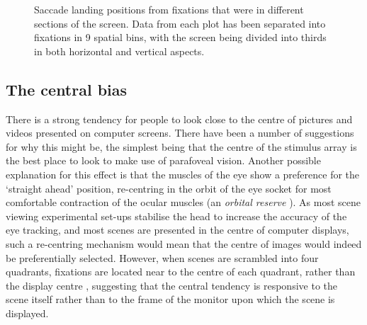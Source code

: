 \begin{figure}[htb]
\caption{Saccade landing positions from fixations that were in different sections of the screen. Data from each plot has been separated into fixations in 9 spatial bins, with the screen being divided into thirds in both horizontal and vertical aspects.}
\label{fig:empiricalSaccadicFlow}
\end{figure}

\subsection{The central bias}
 
There is a strong tendency for people to look close to the centre of pictures \citep{tatler2007, tatler2005, canosa2003, clarke-tatler2014} and videos \citep{tseng2009,loschky2015} presented on computer screens. There have been a number of suggestions for why this might be, the simplest being that the centre of the stimulus array is the best place to look to make use of parafoveal vision. Another possible explanation for this effect is that the muscles of the eye show a preference for the `straight ahead' position, re-centring in the orbit of the eye socket for most comfortable contraction of the ocular muscles (an \emph{orbital reserve} \citep{fuller1996}). As most scene viewing experimental set-ups stabilise the head to increase the accuracy of the eye tracking, and most scenes are presented in the centre of computer displays, such a re-centring mechanism would mean that the centre of images would indeed be preferentially selected. However, when scenes are scrambled into four quadrants, fixations are located near to the centre of each quadrant, rather than the display centre \citep{stainer2013}, suggesting that the central tendency is responsive to the scene itself rather than to the frame of the monitor upon which the scene is displayed. 

